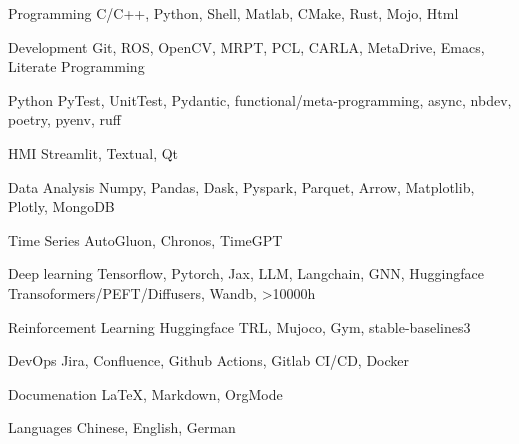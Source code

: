 \documentclass[../cv.tex]{subfiles}
\begin{document}


\begin{cvskills}

  \cvskill
    {Programming} %
    {C/C++, Python, Shell, Matlab, CMake, Rust, Mojo, Html} %

  \cvskill
    {Development} %
    {Git, ROS, OpenCV, MRPT, PCL, CARLA, MetaDrive, Emacs, Literate Programming} %

  \cvskill
    {Python} %
    {PyTest, UnitTest, Pydantic, functional/meta-programming, async, nbdev, poetry, pyenv, ruff} %

  \cvskill
    {HMI} %
    {Streamlit, Textual, Qt} %

  \cvskill
    {Data Analysis} %
    {Numpy, Pandas, Dask, Pyspark, Parquet, Arrow, Matplotlib, Plotly, MongoDB} %

  \cvskill
    {Time Series} %
    {AutoGluon, Chronos, TimeGPT} %

  \cvskill
    {Deep learning} %
    {Tensorflow, Pytorch, Jax, LLM, Langchain, GNN, Huggingface Transoformers/PEFT/Diffusers, Wandb, >10000h} %

  \cvskill
    {Reinforcement Learning} %
    {Huggingface TRL, Mujoco, Gym, stable-baselines3} %

  \cvskill
    {DevOps} %
    {Jira, Confluence, Github Actions, Gitlab CI/CD, Docker} %

  \cvskill
    {Documenation} %
    {LaTeX, Markdown, OrgMode} %

  \cvskill
    {Languages} %
    {Chinese, English, German} %

\end{cvskills}
\end{document}
